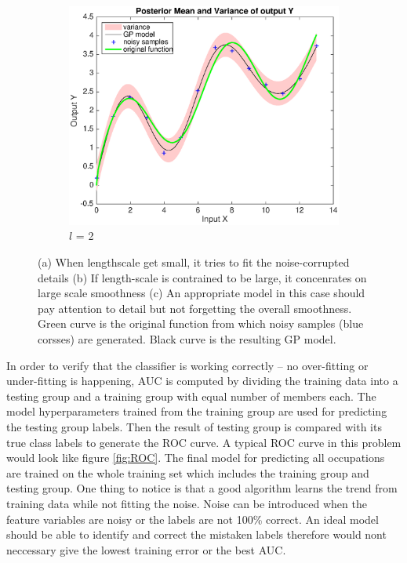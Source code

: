 \documentclass[11pt]{report}
\numberwithin{equation}{chapter}
\begin{document}
\begin{spacing}{2}
\begin{figure}[!htb]
\hspace*{0.25\textwidth}
\begin{subfigure}{0.48\textwidth}
\centering
	\includegraphics[scale = 0.4]{fit.eps}
	\caption{$l$ = 2}
\end{subfigure}



\caption{(a) When lengthscale get small, it tries to fit the noise-corrupted details (b) If length-scale is contrained to be large, it concenrates on large scale smoothness (c) An appropriate model in this case should pay attention to detail but not forgetting the overall smoothness. Green curve is the original function from which noisy samples (blue corsses) are generated. Black curve is the resulting GP model.}

\label{fig:overfitting}
\end{figure}

In order to verify that the classifier is working correctly -- no over-fitting or under-fitting is happening, AUC is computed by dividing the training data into a testing group and a training group with equal number of members each. The model hyperparameters trained from the training group are used for predicting the testing group labels. Then the result of testing group is compared with its true class labels to generate the ROC curve. A typical ROC curve in this problem would look like figure \ref{fig:ROC}. The final model for predicting all occupations are trained on the whole training set which includes the training group and testing group. One thing to notice is that a good algorithm learns the trend from training data while not fitting the noise. Noise can be introduced when the feature variables are noisy or the labels are not 100\% correct. An ideal model should be able to identify and correct the mistaken labels therefore would nont neccessary give the lowest training error or the best AUC.



\end{spacing}
\end{document}
